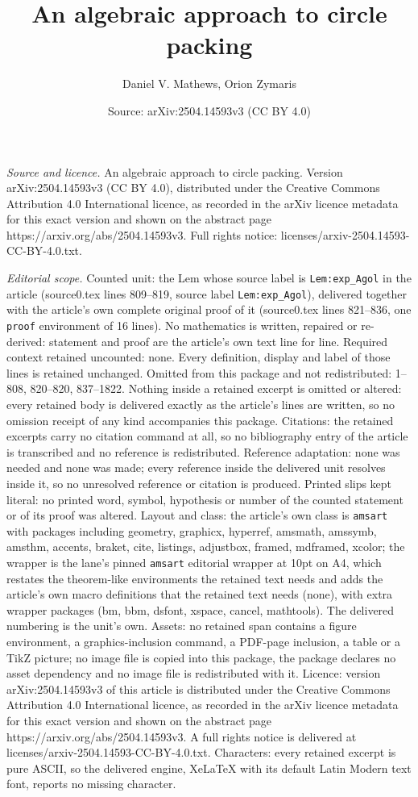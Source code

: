 \documentclass[10pt,a4paper]{amsart}
\title[An algebraic approach to circle packing]{An algebraic approach to circle packing}
\author{Daniel V. Mathews, Orion Zymaris}
\date{Source: arXiv:2504.14593v3 (CC BY 4.0)}
\begin{document}
\maketitle

\noindent\emph{Source and licence.} An algebraic approach to circle packing. Version arXiv:2504.14593v3 (CC BY 4.0), distributed under the Creative Commons Attribution 4.0 International licence, as recorded in the arXiv licence metadata for this exact version and shown on the abstract page https://arxiv.org/abs/2504.14593v3. Full rights notice: licenses/arxiv-2504.14593-CC-BY-4.0.txt.\par\smallskip

\noindent\textit{Editorial scope.} Counted unit: the Lem whose source label is \texttt{Lem:exp\_Agol} in the article (source0.tex lines 809--819, source label \texttt{Lem:exp\_Agol}), delivered together with the article's own complete original proof of it (source0.tex lines 821--836, one \texttt{proof} environment of 16 lines). No mathematics is written, repaired or re-derived: statement and proof are the article's own text line for line. Required context retained uncounted: none. Every definition, display and label of those lines is retained unchanged. Omitted from this package and not redistributed: 1--808, 820--820, 837--1822. Nothing inside a retained excerpt is omitted or altered: every retained body is delivered exactly as the article's lines are written, so no omission receipt of any kind accompanies this package. Citations: the retained excerpts carry no citation command at all, so no bibliography entry of the article is transcribed and no reference is redistributed. Reference adaptation: none was needed and none was made; every reference inside the delivered unit resolves inside it, so no unresolved reference or citation is produced. Printed slips kept literal: no printed word, symbol, hypothesis or number of the counted statement or of its proof was altered. Layout and class: the article's own class is \texttt{amsart} with packages including geometry, graphicx, hyperref, amsmath, amssymb, amsthm, accents, braket, cite, listings, adjustbox, framed, mdframed, xcolor; the wrapper is the lane's pinned \texttt{amsart} editorial wrapper at 10pt on A4, which restates the theorem-like environments the retained text needs and adds the article's own macro definitions that the retained text needs (none), with extra wrapper packages (bm, bbm, dsfont, xspace, cancel, mathtools). The delivered numbering is the unit's own. Assets: no retained span contains a figure environment, a graphics-inclusion command, a PDF-page inclusion, a table or a TikZ picture; no image file is copied into this package, the package declares no asset dependency and no image file is redistributed with it. Licence: version arXiv:2504.14593v3 of this article is distributed under the Creative Commons Attribution 4.0 International licence, as recorded in the arXiv licence metadata for this exact version and shown on the abstract page https://arxiv.org/abs/2504.14593v3. A full rights notice is delivered at licenses/arxiv-2504.14593-CC-BY-4.0.txt. Characters: every retained excerpt is pure ASCII, so the delivered engine, XeLaTeX with its default Latin Modern text font, reports no missing character.
\end{document}
